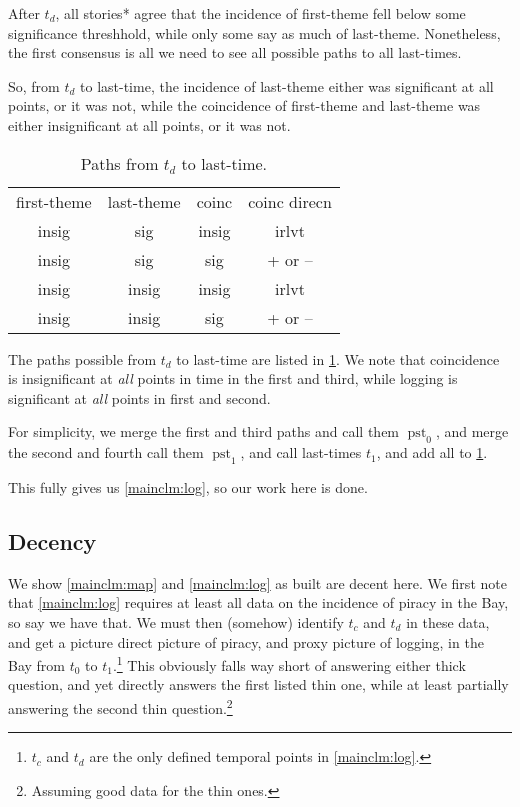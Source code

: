 \documentclass{amsart}
\DeclareMathOperator{\pst}{pst}%
\theoremstyle{definition}
\theoremstyle{remark}
\begin{document}
			After \(t_{d}\), all stories* agree that the incidence of first-theme fell below some significance threshhold, while only some say as much of last-theme. Nonetheless, the first consensus is all we need to see all possible paths to all last-times.
			
			So, from \(t_{d}\) to last-time, the incidence of last-theme either was significant at all points, or it was not, while the coincidence of first-theme and last-theme was either insignificant at all points, or it was not.
			\begin{table}
			\caption{Paths from \(t_{d}\) to last-time.}
			\label{tab:pathsforlog}
			\begin{tabular}{cccc}
			first-theme &last-theme &coinc &coinc direcn\\
			insig	&sig	&insig	&irlvt\\
			insig	&sig	&sig		&+ or --\\
			insig	&insig	&insig	&irlvt\\
			insig	&insig	&sig		&+ or --
			\end{tabular}
			\end{table}
			
			The paths possible from \(t_{d}\) to last-time are listed in \ref{tab:pathsforlog}. We note that coincidence is insignificant at \emph{all} points in time in the first and third, while logging is significant at \emph{all} points in first and second.
			
			For simplicity, we merge the first and third paths and call them \(\pst_{0}\), and merge the second and fourth call them \(\pst_{1}\), and call last-times \(t_{1}\), and add all to \ref{tab:pathsforlog}. 
			
			This fully gives us \ref{mainclm:log}, so our work here is done.
	\subsection{Decency}
		\label{ss:decency}
		We show \ref{mainclm:map} and \ref{mainclm:log} as built are decent here. We first note that \ref{mainclm:log} requires at least all data on the incidence of piracy in the Bay, so say we have that. We must then (somehow) identify \(t_{c}\) and \(t_{d}\) in these data, and get a picture direct picture of piracy, and proxy picture of logging, in the Bay from \(t_{0}\) to \(t_{1}\).\footnote{\(t_{c}\) and \(t_{d}\) are the only defined temporal points in \ref{mainclm:log}.} This obviously falls way short of answering either thick question, and yet directly answers the first listed thin one, while at least partially answering the second thin question.\footnote{Assuming good data for the thin ones.}
		
\end{document}
